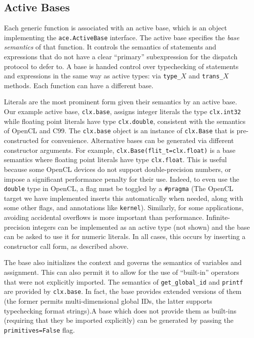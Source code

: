 \documentclass[10pt,preprint]{sigplanconf}
\begin{document}
{\subsection{Active Bases}\label{abases}
Each generic function is associated with an active base, which is an object implementing the \verb|ace.ActiveBase| interface. The active base specifies the \emph{base semantics} of that function. It controls the semantics of statements and expressions that do not have a clear ``primary'' subexpression for the dispatch protocol to defer to. A base is handed control over typechecking of statements and expressions in the same way as active types: via \verb|type_|$X$ and \verb|trans_|$X$ methods.  Each function can have a different base.

Literals are the most prominent form given their semantics by an active base. Our example active base, \verb|clx.base|, assigns integer literals the type \verb|clx.int32| while floating point literals have type \verb|clx.double|, consistent with the semantics of OpenCL and C99. The \verb|clx.base| object is an instance of \verb|clx.Base| that is pre-constructed for convenience. Alternative bases can be generated via different constructor arguments. For example, \verb|clx.Base(flit_t=clx.float)| is a base semantics where floating point literals have type \verb|clx.float|. This is useful because some OpenCL devices do not support double-precision numbers, or impose a significant performance penalty for their use. Indeed, to even use the \verb|double| type in OpenCL, a flag must be toggled by a \verb|#pragma| (The OpenCL target we have implemented inserts this automatically when needed, along with some other flags, and annotations like \verb|kernel|).  Similarly, for some applications, avoiding accidental overflows is more important than performance.  Infinite-precision integers can be implemented as an active type (not shown) and the base can be asked to use it for numeric literals. In all cases, this occurs by inserting a constructor call form, as described above.%

The base also initializes the context and governs the semantics of variables and assignment. This can also permit it to allow for the use of ``built-in'' operators that were not explicitly imported. The semantics of \verb|get_global_id| and \verb|printf| are provided by \verb|clx.base|. In fact, the base provides extended versions of them (the former permits multi-dimensional global IDs, the latter supports typechecking format strings).A base which does not provide them as built-ins (requiring that they be imported explicitly) can be generated by passing the \verb|primitives=False| flag.

}
\end{document}
